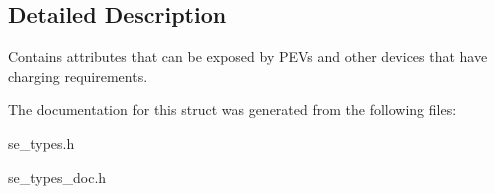 \subsection{Detailed Description}
Contains attributes that can be exposed by P\+E\+Vs and other devices that have charging requirements. 

The documentation for this struct was generated from the following files\+:\begin{DoxyCompactItemize}
\item 
se\+\_\+types.\+h\item 
se\+\_\+types\+\_\+doc.\+h\end{DoxyCompactItemize}
